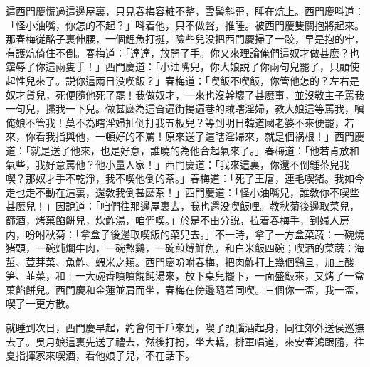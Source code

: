 這西門慶慌過這邊屋裏，只見春梅容粧不整，雲髻斜歪，睡在炕上。西門慶呌道：「怪小油嘴，你怎的不起？」呌着他，只不做聲，推睡。被西門慶雙關抱將起來。那春梅従酩子裏伸腰，一個鯉魚打挺，險些兒没把西門慶掃了一跤，早是抱的牢，有護炕倚住不倒。春梅道：「達達，放開了手。你又來理論俺們這奴才做甚麽？也霑辱了你這兩隻手！」西門慶道：「小油嘴兒，你大娘説了你兩句兒罷了，只顧使起性兒來了。説你這兩日没喫飯？」春梅道：「喫飯不喫飯，你管他怎的？左右是奴才貨兒，死便隨他死了罷！我做奴才，一來也沒幹壞了甚麽事，並沒敎主子罵我一句兒，攩我一下兒。做甚麽為這㒲遍街搗遍巷的賊瞎淫婦，教大娘這等罵我，嗔俺娘不管我！莫不為瞎淫婦扯倒打我五板兒？等到明日韓道國老婆不來便罷，若來，你看我指與他，一頓好的不罵！原來送了這瞎淫婦來，就是個祸根！」西門慶道：「就是送了他來，也是好意，誰曉的為他合起氣來了。」春梅道：「他若肯放和氣些，我好意罵他？他小量人家！」西門慶道：「我來這裏，你還不倒鍾茶兒我喫？那奴才手不乾淨，我不喫他倒的茶。」春梅道：「死了王屠，連毛喫猪。我如今走也走不動在這裏，還敎我倒甚麽茶！」西門慶道：「怪小油嘴兒，誰敎你不喫些甚麽兒！」因說道：「咱們往那邊屋裏去，我也還没喫飯哩。教秋菊後邊取菜兒，篩酒，烤菓餡餅兒，炊鮓湯，咱們喫。」於是不由分説，拉着春梅手，到婦人房内，吩咐秋菊：「拿盒子後邊取喫飯的菜兒去。」不一時，拿了一方盒菜蔬：一碗燒猪頭，一碗炖爛牛肉，一碗熬鷄，一碗煎煿鮮魚，和白米飯四碗；喫酒的菜蔬：海蜇、荳芽菜、魚鮓、蝦米之類。西門慶吩咐春梅，把肉鮓打上幾個鷄旦，加上酸笋、韮菜，和上一大碗香噴噴餛飩湯來，放下桌兒擺下，一面盛飯來，又烤了一盒菓餡餅兒。西門慶和金蓮並肩而坐，春梅在傍邊隨着同喫。三個你一盃，我一盃，喫了一更方散。

就睡到次日，西門慶早起，約會何千戶來到，喫了頭腦酒起身，同往郊外送侯巡撫去了。吳月娘這裏先送了禮去，然後打扮，坐大轎，排軍唱道，來安春鴻跟隨，往夏指揮家來喫酒，看他娘子兒，不在話下。

